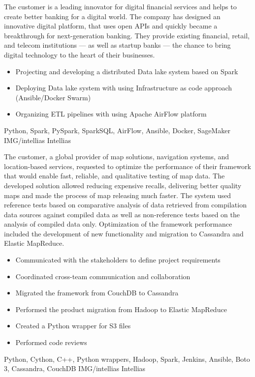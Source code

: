 \documentclass[paper=a4,fontsize=11pt]{temp} %
\begin{document}

\noindent


{The customer is a leading innovator for digital financial services and helps to create better banking for a digital world.
The company has designed an innovative digital platform, that uses open APIs and quickly became a breakthrough for
next-generation banking. They provide existing financial, retail, and telecom institutions — as well as startup banks —
the chance to bring digital technology to the heart of their businesses.}
{
\begin{itemize}
    \setlength\itemsep{0em}
    \item Projecting and developing a distributed Data lake system based on Spark 
    \item Deploying Data lake system with using Infrastructure as code approach (Ansible/Docker Swarm)
    \item Organizing ETL pipelines with using Apache AirFlow platform
\end{itemize}
}
{Python, Spark, PySpark, SparkSQL, AirFlow, Ansible, Docker, SageMaker}
{IMG/intellias}
{Intellias}

\sepspace

{The customer, a global provider of map solutions, navigation systems, and location-based services, requested to
optimize the performance of their framework that would enable fast, reliable, and qualitative testing of map data. The
developed solution allowed reducing expensive recalls, delivering better quality maps and made the process of map
releasing much faster. The system used reference tests based on comparative analysis of data retrieved from compilation
data sources against compiled data as well as non-reference tests based on the analysis of compiled data only.
Optimization of the framework performance included the development of new functionality and migration to Cassandra and
Elastic MapReduce.}
{
\begin{itemize}
    \setlength\itemsep{0em}
    \item Communicated with the stakeholders to define project requirements
    \item Coordinated cross-team communication and collaboration
    \item Migrated the framework from CouchDB to Cassandra
    \item Performed the product migration from Hadoop to Elastic MapReduce
    \item Created a Python wrapper for S3 files
    \item Performed code reviews
\end{itemize}
}
{Python, Cython, C++, Python wrappers, Hadoop, Spark, Jenkins, Ansible, Boto 3, Cassandra, CouchDB}
{IMG/intellias}
{Intellias}
\end{document}
